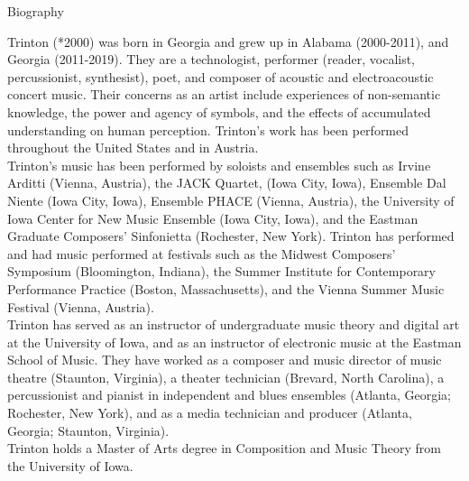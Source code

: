 \documentclass[11pt]{article}
\begin{document}
\vspace*{2\baselineskip}

\begingroup
\begin{center}
\huge Biography
\end{center}
\endgroup

\vspace*{2\baselineskip}

\begingroup
\begin{center}
Trinton (*2000) was born in Georgia and grew up in Alabama (2000-2011), and Georgia (2011-2019). They are a technologist, performer (reader, vocalist, percussionist, synthesist), poet, and composer of acoustic and electroacoustic concert music. Their concerns as an artist include experiences of non-semantic knowledge, the power and agency of symbols, and the effects of accumulated understanding on human perception. Trinton's work has been performed throughout the United States and in Austria. \\ Trinton's music has been performed by soloists and ensembles such as Irvine Arditti (Vienna, Austria), the JACK Quartet, (Iowa City, Iowa),  Ensemble Dal Niente (Iowa City, Iowa), Ensemble PHACE (Vienna, Austria), the University of Iowa Center for New Music Ensemble (Iowa City, Iowa), and the Eastman Graduate Composers' Sinfonietta (Rochester, New York). Trinton has performed and had music performed at festivals such as the Midwest Composers' Symposium (Bloomington, Indiana), the Summer Institute for Contemporary Performance Practice (Boston, Massachusetts), and the Vienna Summer Music Festival (Vienna, Austria). \\ Trinton has served as an instructor of undergraduate music theory and digital art at the University of Iowa, and as an instructor of electronic music at the Eastman School of Music. They have worked as a composer and music director of music theatre (Staunton, Virginia), a theater technician (Brevard, North Carolina), a percussionist and pianist in independent and blues ensembles (Atlanta, Georgia; Rochester, New York), and as a media technician and producer (Atlanta, Georgia; Staunton, Virginia). \\ Trinton holds a Master of Arts degree in Composition and Music Theory from the University of Iowa. 
\end{center}
\endgroup
\end{document}
